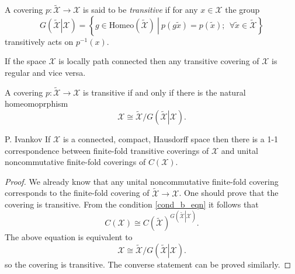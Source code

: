 \documentclass{beamer}
\theoremstyle{plain}
\begin{document}
\begin{frame}

\begin{definition}
	A covering $ p:\widetilde{\mathcal  X}\to \mathcal  X$ is said to be \textit{transitive} if for any $x \in \mathcal  X$ the group
	$$
	G\left(\left.\widetilde{\mathcal  X} \right|\mathcal  X\right)= \left\{ \left.g \in \text{Homeo}\left(\widetilde{\mathcal X} \right)~\right|~ p(g\widetilde{x}) = p(\widetilde{x});~~\forall \widetilde{x} \in \widetilde{\mathcal  X}\right\} 
	$$
	transitively acts on $p^{-1}\left(x\right)$.
\end{definition}
\begin{fact}
	If the space $ \mathcal  X$ is locally path connected then any transitive covering  of $ \mathcal  X$  is regular and vice versa.
\end{fact}
\begin{fact}
	A covering $ p:\widetilde{\mathcal  X}\to \mathcal  X$ is {transitive} if and only if there is the natural homeomoprphism
	$$
\mathcal  X \cong \widetilde{\mathcal  X}/		G\left(\left.\widetilde{\mathcal  X} \right|\mathcal  X\right).
	$$
	
\end{fact}
\end{frame}
\begin{frame}
\begin{lemma}
	\alert{P. Ivankov}
	If $\mathcal  X$ is a connected, compact, Hausdorff space then there is a 1-1 correspondence between finite-fold transitive coverings of $\mathcal  X$ and unital noncommutative finite-fold  coverings of $C\left(\mathcal  X\right)$.
\end{lemma}

\begin{proof}
We already know that any  unital noncommutative finite-fold  covering corresponds to the finite-fold covering of $\widetilde{\mathcal  X}\to \mathcal  X$. One should prove that the covering is transitive. From the condition \eqref{cond_b_eqn} it follows that
$$
C\left(\mathcal  X\right)\cong C\left(\widetilde{\mathcal  X}\right)^{G\left(\left.\widetilde{\mathcal  X} \right|\mathcal  X\right)}.
$$
The above equation is equivalent to
$$
{\mathcal  X}\cong\widetilde{\mathcal  X}/ G\left(\left.\widetilde{\mathcal  X} \right|\mathcal  X\right).
$$
so the covering is transitive. The converse statement can be proved similarly.
\end{proof}
\end{frame}
\end{document}
